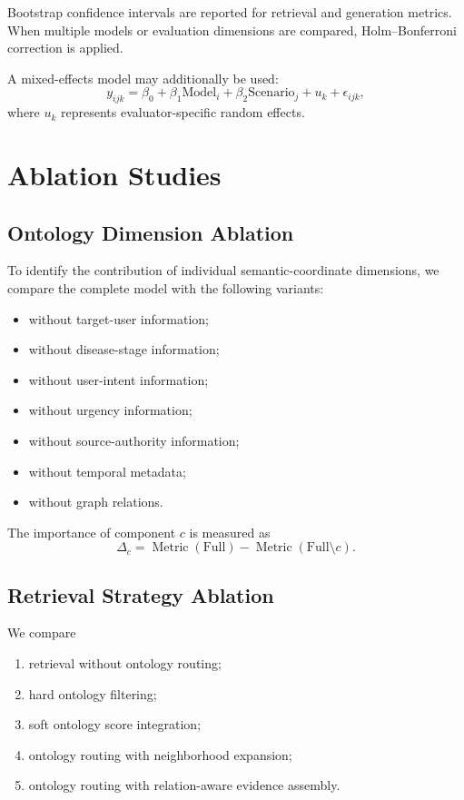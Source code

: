 \documentclass{article}
\begin{document}
Bootstrap confidence intervals are reported for retrieval and generation metrics. When multiple models or evaluation dimensions are compared, Holm--Bonferroni correction is applied.

A mixed-effects model may additionally be used:
\begin{equation}
    y_{ijk}
    =
    \beta_0
    +
    \beta_1 \mathrm{Model}_i
    +
    \beta_2 \mathrm{Scenario}_j
    +
    u_k
    +
    \epsilon_{ijk},
\end{equation}
where $u_k$ represents evaluator-specific random effects.

\section{Ablation Studies}

\subsection{Ontology Dimension Ablation}
To identify the contribution of individual semantic-coordinate dimensions, we compare the complete model with the following variants:
\begin{itemize}
    \item without target-user information;
    \item without disease-stage information;
    \item without user-intent information;
    \item without urgency information;
    \item without source-authority information;
    \item without temporal metadata;
    \item without graph relations.
\end{itemize}

The importance of component $c$ is measured as
\begin{equation}
    \Delta_c
    =
    \operatorname{Metric}(\mathrm{Full})
    -
    \operatorname{Metric}(\mathrm{Full}\setminus c).
\end{equation}

\subsection{Retrieval Strategy Ablation}
We compare
\begin{enumerate}
    \item retrieval without ontology routing;
    \item hard ontology filtering;
    \item soft ontology score integration;
    \item ontology routing with neighborhood expansion;
    \item ontology routing with relation-aware evidence assembly.
\end{enumerate}
\end{document}
